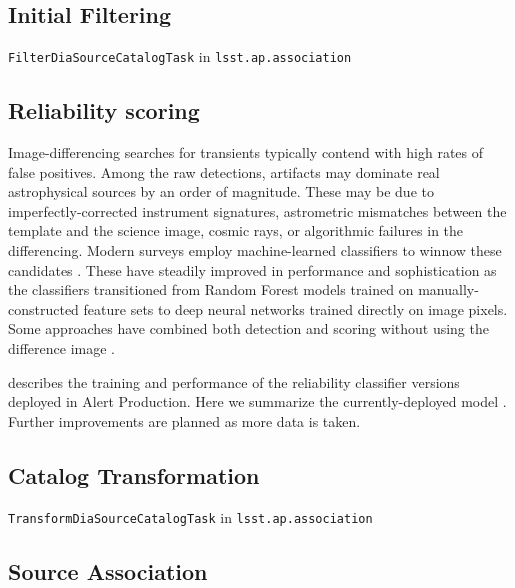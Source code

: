 \subsection{Initial Filtering} \label{sec:filtering}



\texttt{FilterDiaSourceCatalogTask} in \texttt{lsst.ap.association}

\subsection{Reliability scoring}

Image-differencing searches for transients typically contend with high rates of false positives.
Among the raw detections, artifacts may dominate real astrophysical sources by an order of magnitude.
These may be due to imperfectly-corrected instrument signatures, astrometric mismatches between the template and the science image, cosmic rays, or algorithmic failures in the differencing.
Modern surveys employ machine-learned classifiers to winnow these candidates \citep[e.g.,][]{Bailey:07:NearbySNFML,Bloom:12:RealBogus,Brink:13:RB2,Wright:15:PS1ML,Goldstein:15:DESRealBogus,Duev:19:Braii}.
These have steadily improved in performance and sophistication as the classifiers transitioned from Random Forest models trained on manually-constructed feature sets to deep neural networks trained directly on image pixels.
Some approaches have combined both detection and scoring without using the difference image \citep{Sedaghat:18:Transinet,Acero-Cuellar:23:NoDifference}.

\citet{DMTN-337} describes the training and performance of the reliability classifier versions deployed in Alert Production.
Here we summarize the currently-deployed model .
Further improvements are planned as more data is taken.

\subsection{Catalog Transformation}

\texttt{TransformDiaSourceCatalogTask} in  \texttt{lsst.ap.association}


\subsection{Source Association}

